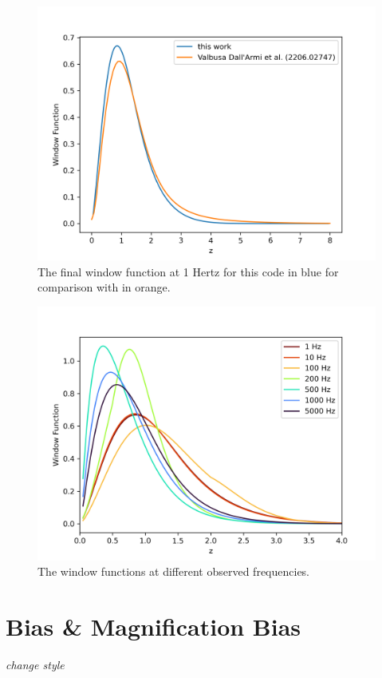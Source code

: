 \begin{figure}[h]
    \centering
    \includegraphics[width=0.8\linewidth]{Images/window_comparison.png}
    \caption{The final window function at 1 Hertz for this code in blue for comparison with \cite{dallarmi_dipole_2022} in orange.}
    \label{window_comparison}
\end{figure} 
\begin{figure}[h]
    \centering
    \includegraphics[width=1\linewidth]{Images/window_diff_frequencies.png}
    \caption{The window functions at different observed frequencies.}
    \label{window_frequencies}
\end{figure} 


\section{Bias \& Magnification Bias}
\textit{change style}

